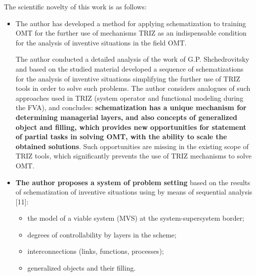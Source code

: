 \documentclass[11pt,a4paper]{book}
\begin{document}
The scientific novelty of this work is as follows:
\begin{itemize}
\item The author has developed a method for applying schematization to
  training OMT for the further use of mechanisms TRIZ as an indispensable
  condition for the analysis of inventive situations in the field OMT.

  The author conducted a detailed analysis of the work of G.P. Shchedrovitsky
  and based on the studied material developed a sequence of schematizations
  for the analysis of inventive situations simplifying the further use of TRIZ
  tools in order to solve such problems. The author considers analogues of
  such approaches used in TRIZ (system operator and functional modeling during
  the FVA), and concludes: \textbf{schematization has a unique mechanism for
    determining managerial layers, and also concepts of generalized object and
    filling, which provides new opportunities for statement of partial tasks
    in solving OMT, with the ability to scale the obtained solutions}. Such
  opportunities are missing in the existing scope of TRIZ tools, which
  significantly prevents the use of TRIZ mechanisms to solve OMT.
\item \textbf{The author proposes a system of problem setting} based on the
  results of schematization of inventive situations using by means of
  sequential analysis [11]:
  \begin{itemize}
  \item the model of a viable system (MVS) at the system-supersystem border;
  \item degrees of controllability by layers in the scheme;
  \item interconnections (links, functions, processes);
  \item generalized objects and their filling.
  \end{itemize}
  

\end{itemize}
\end{document}
